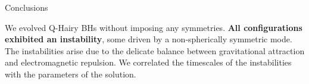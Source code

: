 \begin{block}{Conclusions}

We evolved Q-Hairy \glspl{BH} without imposing any symmetries. \textbf{All configurations exhibited an instability}, some driven by a non-spherically symmetric mode. The instabilities arise due to the delicate balance between gravitational attraction and electromagnetic repulsion. We correlated the timescales of the instabilities with the parameters of the solution.

\end{block}
